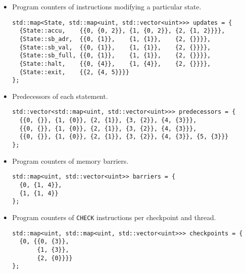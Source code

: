 \begin{itemize}
\item Program counters of instructions modifying a particular state.
\begin{lstlisting}[style=c++]
std::map<State, std::map<uint, std::vector<uint>>> updates = {
  {State::accu,    {{0, {0, 2}}, {1, {0, 2}}, {2, {1, 2}}}},
  {State::sb_adr,  {{0, {1}},    {1, {1}},    {2, {}}}},
  {State::sb_val,  {{0, {1}},    {1, {1}},    {2, {}}}},
  {State::sb_full, {{0, {1}},    {1, {1}},    {2, {}}}},
  {State::halt,    {{0, {4}},    {1, {4}},    {2, {}}}},
  {State::exit,    {{2, {4, 5}}}}
};
\end{lstlisting}

\item Predecessors of each statement.
\begin{lstlisting}[style=c++]
std::vector<std::map<uint, std::vector<uint>>> predecessors = {
  {{0, {}}, {1, {0}}, {2, {1}}, {3, {2}}, {4, {3}}},
  {{0, {}}, {1, {0}}, {2, {1}}, {3, {2}}, {4, {3}}},
  {{0, {}}, {1, {0}}, {2, {1}}, {3, {2}}, {4, {3}}, {5, {3}}}
};
\end{lstlisting}

\item Program counters of memory barriers.
\begin{lstlisting}[style=c++]
std::map<uint, std::vector<uint>> barriers = {
  {0, {1, 4}},
  {1, {1, 4}}
};
\end{lstlisting}

\item Program counters of \lstinline[language={[concubine]Assembler}]{CHECK} instructions per checkpoint and thread.
\begin{lstlisting}[style=c++]
std::map<uint, std::map<uint, std::vector<uint>>> checkpoints = {
  {0, {{0, {3}},
       {1, {3}},
       {2, {0}}}}
};
\end{lstlisting}
\end{itemize}


